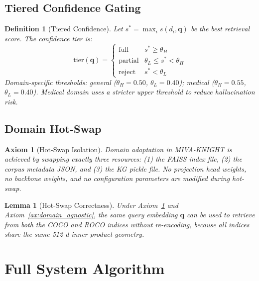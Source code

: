 \documentclass[10pt,conference]{IEEEtran}
\theoremstyle{ieeethm}
\newtheorem{lemma}[theorem]{Lemma}
\theoremstyle{ieeedef}
\newtheorem{definition}[theorem]{Definition}
\newtheorem{axiom}{Axiom}
\theoremstyle{ieeeremark}
\begin{document}
\subsection{Tiered Confidence Gating}

\begin{definition}[Tiered Confidence]
\label{def:confidence}
Let $s^* = \max_i s(d_i, \mathbf{q})$ be the best retrieval score. The confidence tier is:
\begin{equation}
\text{tier}(\mathbf{q}) = \begin{cases}
  \text{full}    & s^* \geq \theta_H \\
  \text{partial} & \theta_L \leq s^* < \theta_H \\
  \text{reject}  & s^* < \theta_L
\end{cases}
\label{eq:tier}
\end{equation}
Domain-specific thresholds: general ($\theta_H{=}0.50$, $\theta_L{=}0.40$); medical ($\theta_H{=}0.55$, $\theta_L{=}0.40$). Medical domain uses a stricter upper threshold to reduce hallucination risk.
\end{definition}

\subsection{Domain Hot-Swap}

\begin{axiom}[Hot-Swap Isolation]
\label{ax:hotswap}
Domain adaptation in MIVA-KNIGHT is achieved by swapping exactly three resources: (1) the FAISS index file, (2) the corpus metadata JSON, and (3) the KG pickle file. No projection head weights, no backbone weights, and no configuration parameters are modified during hot-swap.
\end{axiom}

\begin{lemma}[Hot-Swap Correctness]
\label{lem:hotswap}
Under Axiom~\ref{ax:hotswap} and Axiom~\ref{ax:domain_agnostic}, the same query embedding $\mathbf{q}$ can be used to retrieve from both the COCO and ROCO indices without re-encoding, because all indices share the same 512-d inner-product geometry.
\end{lemma}

\section{Full System Algorithm}
\label{sec:algorithm}
\end{document}
